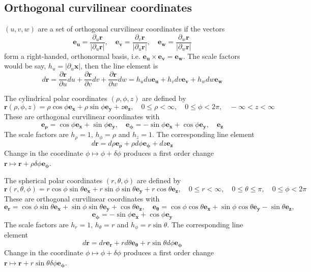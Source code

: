 \documentclass[a4paper]{article}
\begin{document}
\subsection{Orthogonal curvilinear coordinates}
\begin{defi}
$(u,v,w)$ are a set of orthogonal curvilinear coordinates if the vectors
\begin{equation}
    \mathbf{e_u}=\frac{\partial_u\mathbf{r}}{|\partial_u\mathbf{r}|},\quad\mathbf{e_v}=\frac{\partial_v\mathbf{r}}{|\partial_u\mathbf{r}|},\quad\mathbf{e_w}=\frac{\partial_w\mathbf{r}}{|\partial_w\mathbf{r}|}\tag{1.12}
\end{equation}
form a right-handed, orthonormal basis, i.e. $\mathbf{e_u}\times\mathbf{e_v}=\mathbf{e_w}$. The scale factors would be say, $h_u=|\partial_u\mathbf{x}|$, then the line element is
\begin{equation}
  d\mathbf{r}=\frac{\partial\mathbf{r}}{\partial u}du+\frac{\partial\mathbf{r}}{\partial v}dv+\frac{\partial\mathbf{r}}{\partial w}dw=h_udu\mathbf{e_u}+h_vdv\mathbf{e_v}+h_wdw\mathbf{e_w}\tag{1.13}  
\end{equation}
\end{defi}
\begin{eg}
The cylindrical polar coordinates $(\rho,\phi,z)$ are defined by
$$\mathbf{r}(\rho,\phi,z)=\rho\cos\phi\mathbf{e_x}+\rho\sin\phi\mathbf{e_y}+z\mathbf{e_z},\quad 0\leq\rho<\infty,\quad 0\leq\phi<2\pi,\quad -\infty<z<\infty$$
These are orthogonal curvilinear coordinates with
$$\boldsymbol{e_\rho}=\cos\phi\mathbf{e_x}+\sin\phi\mathbf{e_y},\quad\boldsymbol{e_\phi}=-\sin\phi\mathbf{e_x}+\cos\phi\mathbf{e_y},\quad\mathbf{e_z}$$
The scale factors are $h_\rho=1$, $h_\phi=\rho$ and $h_z=1$. The corresponding line element
$$d\mathbf{r}=d\rho\boldsymbol{e_\rho}+\rho d\phi\boldsymbol{e_\phi}+dz\mathbf{e_z}$$
Change in the coordinate $\phi\mapsto\phi+\delta\phi$ produces a first order change $\mathbf{r}\mapsto\mathbf{r}+\rho\delta\phi\boldsymbol{e_\phi}$.
\end{eg}
\begin{eg}
The spherical polar coordinates $(r,\theta,\phi)$ are defined by
$$\mathbf{r}(r,\theta,\phi)=r\cos\phi\sin\theta\mathbf{e_x}+r\sin\phi\sin\theta\mathbf{e_y}+r\cos\theta\mathbf{e_z},\quad 0\leq r<\infty,\quad 0\leq\theta\leq\pi,\quad 0\leq\phi<2\pi$$
These are orthogonal curvilinear coordinates with
$$\boldsymbol{e_r}=\cos\phi\sin\theta\mathbf{e_x}+\sin\phi\sin\theta\mathbf{e_y}+\cos\theta\mathbf{e_z},\quad \boldsymbol{e_\theta}=\cos\phi\cos\theta\mathbf{e_x}+\sin\phi\cos\theta\mathbf{e_y}-\sin\theta\mathbf{e_z},$$
$$\boldsymbol{e_\phi}=-\sin\phi\mathbf{e_x}+\cos\phi\mathbf{e_y}$$
The scale factors are $h_r=1$, $h_\theta=r$ and $h_\phi=r\sin\theta$. The corresponding line element
$$d\mathbf{r}=dr\boldsymbol{e_r}+r  d\theta\boldsymbol{e_\theta}+r\sin\theta d\phi\mathbf{e_\phi}$$
Change in the coordinate $\phi\mapsto\phi+\delta\phi$ produces a first order change $\mathbf{r}\mapsto\mathbf{r}+r\sin\theta\delta\phi\boldsymbol{e_\phi}$.
\end{eg}
\end{document}
